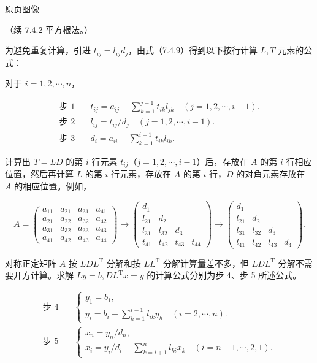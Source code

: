 \documentclass[
  10pt,
  fontset=fandol]{ctexart}
\begin{document}
\href{../../source-images/pdf-197.jpeg}{原页图像}

（续 7.4.2 平方根法。）

为避免重复计算，引进 \(t_{ij}=l_{ij}d_j\)，由式（7.4.9）得到以下按行计算 \(L,T\) 元素的公式：

对于 \(i=1,2,\cdots,n\)，

\[
\begin{aligned}
\text{步 1}\quad &t_{ij}=a_{ij}-\sum_{k=1}^{j-1}t_{ik}l_{jk}\quad(j=1,2,\cdots,i-1).\\
\text{步 2}\quad &l_{ij}=t_{ij}/d_j\quad(j=1,2,\cdots,i-1).\\
\text{步 3}\quad &d_i=a_{ii}-\sum_{k=1}^{i-1}t_{ik}l_{ik}.
\end{aligned}
\tag{7.4.10}
\]

计算出 \(T=LD\) 的第 \(i\) 行元素 \(t_{ij}\)（\(j=1,2,\cdots,i-1\)）后，存放在 \(A\) 的第 \(i\) 行相应位置，然后再计算 \(L\) 的第 \(i\) 行元素，存放在 \(A\) 的第 \(i\) 行，\(D\) 的对角元素存放在 \(A\) 的相应位置。例如，

\[
A=\begin{pmatrix}
a_{11}&a_{21}&a_{31}&a_{41}\\
a_{21}&a_{22}&a_{32}&a_{42}\\
a_{31}&a_{32}&a_{33}&a_{43}\\
a_{41}&a_{42}&a_{43}&a_{44}
\end{pmatrix}
\longrightarrow
\begin{pmatrix}
d_1&&&\\
l_{21}&d_2&&\\
l_{31}&l_{32}&d_3&\\
t_{41}&t_{42}&t_{43}&t_{44}
\end{pmatrix}
\longrightarrow
\begin{pmatrix}
d_1&&&\\
l_{21}&d_2&&\\
l_{31}&l_{32}&d_3&\\
l_{41}&l_{42}&l_{43}&d_4
\end{pmatrix}.
\]

对称正定矩阵 \(A\) 按 \(LDL^{\mathrm T}\) 分解和按 \(LL^{\mathrm T}\) 分解计算量差不多，但 \(LDL^{\mathrm T}\) 分解不需要开方计算。求解 \(Ly=b,DL^{\mathrm T}x=y\) 的计算公式分别为步 4、步 5 所述公式。

\[
\begin{aligned}
\text{步 4}\quad &\begin{cases}
y_1=b_1,\\
y_i=b_i-\displaystyle\sum_{k=1}^{i-1}l_{ik}y_h\quad(i=2,\cdots,n).
\end{cases}\\
\text{步 5}\quad &\begin{cases}
x_n=y_n/d_n,\\
x_i=y_i/d_i-\displaystyle\sum_{k=i+1}^{n}l_{ki}x_k\quad(i=n-1,\cdots,2,1).
\end{cases}
\end{aligned}
\tag{7.4.11}
\]
\end{document}
